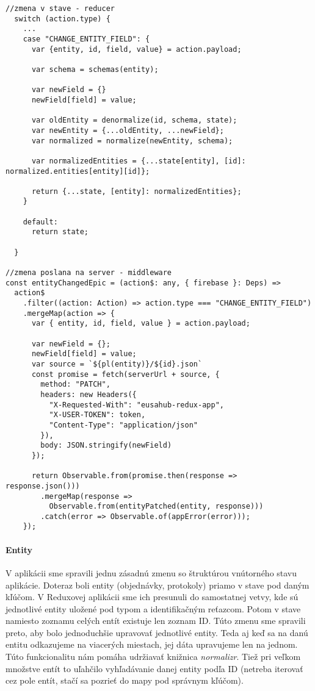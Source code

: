 \begin{lstlisting}[caption=Dotaz na server v Redux-e cez middleware]
//zmena v stave - reducer
  switch (action.type) {
  	...
    case "CHANGE_ENTITY_FIELD": {
      var {entity, id, field, value} = action.payload;

      var schema = schemas(entity);

      var newField = {}
      newField[field] = value;

      var oldEntity = denormalize(id, schema, state);
      var newEntity = {...oldEntity, ...newField};
      var normalized = normalize(newEntity, schema);

      var normalizedEntities = {...state[entity], [id]: normalized.entities[entity][id]};

      return {...state, [entity]: normalizedEntities};
    }

    default:
      return state;

  }

//zmena poslana na server - middleware
const entityChangedEpic = (action$: any, { firebase }: Deps) =>
  action$
    .filter((action: Action) => action.type === "CHANGE_ENTITY_FIELD")
    .mergeMap(action => {
      var { entity, id, field, value } = action.payload;

      var newField = {};
      newField[field] = value;
      var source = `${pl(entity)}/${id}.json`
      const promise = fetch(serverUrl + source, {
        method: "PATCH",
        headers: new Headers({
          "X-Requested-With": "eusahub-redux-app",
          "X-USER-TOKEN": token,
          "Content-Type": "application/json"
        }),
        body: JSON.stringify(newField)
      });

      return Observable.from(promise.then(response => response.json()))
        .mergeMap(response =>
          Observable.from(entityPatched(entity, response)))
        .catch(error => Observable.of(appError(error)));
    });
\end{lstlisting}


\paragraph{Entity}%
V aplikácii sme spravili jednu zásadnú zmenu so štruktúrou vnútorného stavu aplikácie. Doteraz boli entity (objednávky, protokoly) priamo v stave pod daným kľúčom. 
V Reduxovej aplikácii sme ich presunuli do samostatnej vetvy, kde sú jednotlivé entity uložené pod typom a identifikačným reťazcom. Potom v stave namiesto zoznamu celých entít existuje len zoznam ID. 
Túto zmenu sme spravili preto, aby bolo jednoduchšie upravovať jednotlivé entity. Teda aj keď sa na danú entitu odkazujeme na viacerých miestach, jej dáta upravujeme len na jednom. Túto funkcionalitu nám pomáha udržiavať knižnica \emph{normalizr}.
Tiež pri veľkom množstve entít to uľahčilo vyhľadávanie danej entity podľa ID (netreba iterovať cez pole entít, stačí sa pozrieť do mapy pod správnym kľúčom).


